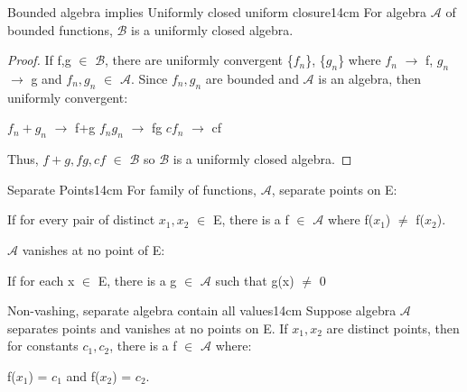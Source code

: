     \vspace{0.5cm}



    \begin{wtheorem}{Bounded algebra implies Uniformly closed uniform closure}{14cm}
        For algebra $\mathscr{A}$ of bounded functions, $\mathscr{B}$
        is a uniformly closed algebra.
    \end{wtheorem}

    \begin{proof}
        If f,g $\in$ $\mathscr{B}$, there are uniformly convergent \{$f_n$\},
        \{$g_n$\} where $f_n$ $\rightarrow$ f, $g_n$ $\rightarrow$ g
        and $f_n,g_n$ $\in$ $\mathscr{A}$.
        Since $f_n,g_n$ are bounded and $\mathscr{A}$ is an algebra, then
        uniformly convergent:

        \hspace{0.5cm}
        $f_n + g_n$ $\rightarrow$ f+g
        \hspace{0.5cm}
        $f_ng_n$ $\rightarrow$ fg
        \hspace{0.5cm}
        $cf_n$ $\rightarrow$ cf

        Thus, $f+g, fg, cf$ $\in$ $\mathscr{B}$ so $\mathscr{B}$
        is a uniformly closed algebra.
    \end{proof}

    \newpage



    \begin{definition}{Separate Points}{14cm}
        For family of functions, $\mathscr{A}$, separate points on E:

        \hspace{0.5cm}
        If for every pair of distinct $x_1,x_2$ $\in$ E, there
        is a f $\in$ $\mathscr{A}$ where f($x_1$) $\not =$ f($x_2$).

        \vspace{0.3cm}

        $\mathscr{A}$ vanishes at no point of E:

        \hspace{0.5cm}
        If for each x $\in$ E, there is a g $\in$ $\mathscr{A}$
        such that g(x) $\not =$ 0
    \end{definition}

    \vspace{0.5cm}




    \begin{wtheorem}{Non-vashing, separate algebra contain all values}{14cm}
        Suppose algebra $\mathscr{A}$ separates points and vanishes
        at no points on E. If $x_1,x_2$ are distinct points, then for
        constants $c_1,c_2$, there is a f $\in$ $\mathscr{A}$ where:

        \hspace{0.5cm}
        f($x_1$) = $c_1$ and f($x_2$) = $c_2$.
    \end{wtheorem}

